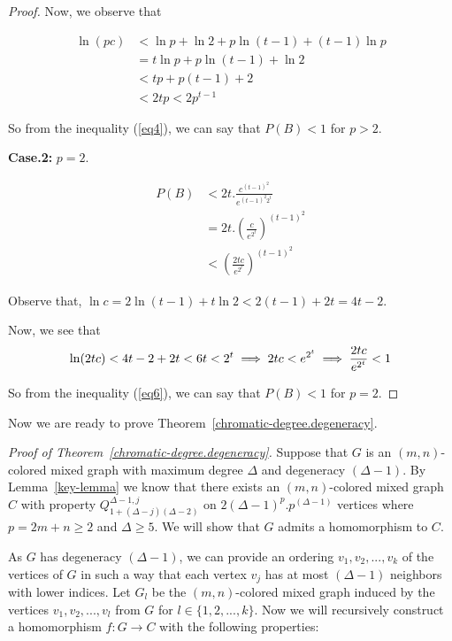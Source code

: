\documentclass[11pt]{article}
\begin{document}
\begin{proof}
Now, we observe that

\begin{equation*} \label{eq5}
\begin{split}
 \ln (pc) & < \ln p + \ln 2 + p\ln (t - 1) + (t - 1)\ln p \\
 & = t \ln p + p\ln (t - 1) + \ln 2 \\
 & <  tp + p(t - 1) + 2 \\
 & < 2tp < 2p^{t - 1} 
\end{split}
\end{equation*}

So from the inequality (\ref{eq4}), we can say that $P(B) < 1$ for $p >2$.


\medskip

\textbf{Case.2:} $p = 2$.

\begin{equation} \label{eq6}
\begin{split}
 P(B) & < 2t. \frac{c^{(t - 1)^2}}{e^{(t - 1)^2 2^t}} \\
 & = 2t. \left(\frac{c}{e^{2^t}}\right)^{(t - 1)^2} \\
 & < \left(\frac{2tc}{e^{2^t}}\right)^{(t - 1)^2}
\end{split}
\end{equation}

Observe that, $\ln c = 2 \ln (t-1) + t \ln 2 < 2(t - 1) + 2t = 4t - 2$.

Now, we see that 
\[
 \ln (2tc) < 4t - 2 + 2t < 6t < 2^t \\
 \implies 2tc < e^{2^t} \\
 \implies \frac{2tc}{e^{2^t}} < 1
\]

So from the inequality (\ref{eq6}), we can say that $P(B) < 1$ for $p = 2$.
\end{proof}

Now we are ready to prove Theorem~\ref{chromatic-degree.degeneracy}.

\medskip

\noindent \textit{Proof of Theorem~\ref{chromatic-degree.degeneracy}.} Suppose that $G$ is an $(m,n)$-colored mixed graph with maximum degree $\Delta$ and degeneracy 
$(\Delta-1)$.
By Lemma~\ref{key-lemma} we know that there exists an $(m,n)$-colored mixed graph $C$ with property 
$Q^{\Delta-1,j}_{1+(\Delta-j)(\Delta-2)}$ on $2 (\Delta-1)^p .p^{(\Delta-1)}$ vertices
where $p = 2m+n \geq 2$ and $\Delta \geq 5$. We will show that $G$ admits a homomorphism to $C$. 


As $G$ has degeneracy $(\Delta-1)$, we can provide an ordering $v_1, v_2, ..., v_k$ of the vertices of $G$ in such a way that each vertex $v_j$ has at most $(\Delta-1)$ neighbors with lower indices.
Let $G_l$ be the  $(m,n)$-colored mixed graph induced by the vertices $v_1, v_2, ..., v_l$ from $G$ for $l \in \{1,2,...,k\}$. 
Now we will recursively construct a  homomorphism $f: G \rightarrow C$ with the following properties:
\end{document}
